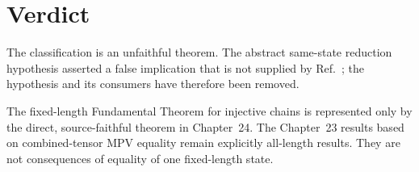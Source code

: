 \documentclass{article}
\begin{document}
\section{Verdict}

The classification is an unfaithful theorem. The abstract same-state reduction
hypothesis asserted a false implication that is not supplied by
Ref.~\cite{Molnar2018NormalPEPS}; the hypothesis and its consumers have
therefore been removed.

The fixed-length Fundamental Theorem for injective chains is represented only
by the direct, source-faithful theorem in Chapter~24. The Chapter~23 results
based on combined-tensor MPV equality remain explicitly all-length results.
They are not consequences of equality of one fixed-length state.



\end{document}
